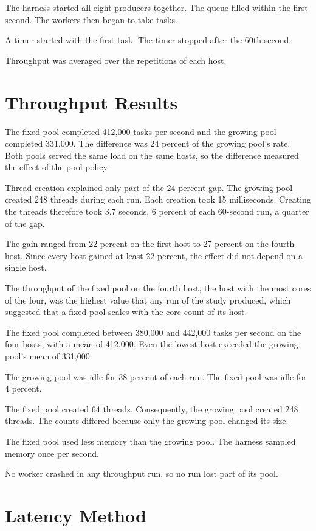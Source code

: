 The harness started all eight producers together. The queue filled within the first second. The workers then began to take tasks.

A timer started with the first task. The timer stopped after the 60th second.

Throughput was averaged over the repetitions of each host.

\section{Throughput Results}

The fixed pool completed 412,000 tasks per second and the growing pool completed 331,000. The difference was 24 percent of the growing pool's rate. Both pools served the same load on the same hosts, so the difference measured the effect of the pool policy.

Thread creation explained only part of the 24 percent gap. The growing pool created 248 threads during each run. Each creation took 15 milliseconds. Creating the threads therefore took 3.7 seconds, 6 percent of each 60-second run, a quarter of the gap.

The gain ranged from 22 percent on the first host to 27 percent on the fourth host. Since every host gained at least 22 percent, the effect did not depend on a single host.

The throughput of the fixed pool on the fourth host, the host with the most cores of the four, was the highest value that any run of the study produced, which suggested that a fixed pool scales with the core count of its host.

The fixed pool completed between 380,000 and 442,000 tasks per second on the four hosts, with a mean of 412,000. Even the lowest host exceeded the growing pool's mean of 331,000.

The growing pool was idle for 38 percent of each run. The fixed pool was idle for 4 percent.

The fixed pool created 64 threads. Consequently, the growing pool created 248 threads. The counts differed because only the growing pool changed its size.

The fixed pool used less memory than the growing pool. The harness sampled memory once per second.

No worker crashed in any throughput run, so no run lost part of its pool.

\section{Latency Method}

